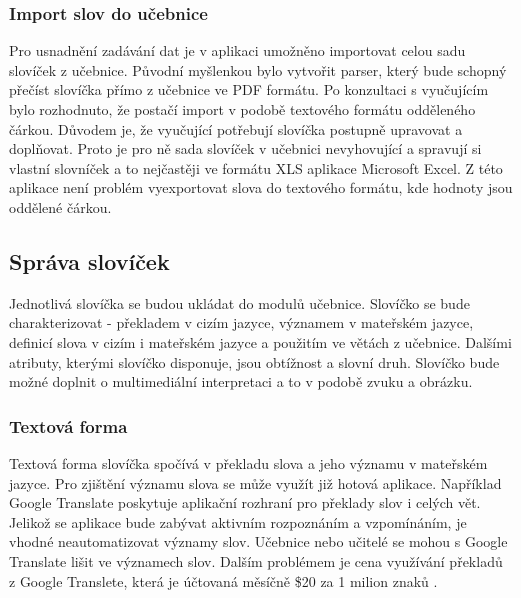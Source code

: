 \documentclass[a4paper,11pt,titlepage,fleqn]{article}
\begin{document}
        \subsubsection{Import slov do učebnice}
            Pro usnadnění zadávání dat je v aplikaci umožněno importovat celou sadu slovíček z učebnice. Původní myšlenkou bylo vytvořit parser, který bude schopný přečíst slovíčka přímo z učebnice ve PDF formátu. Po konzultaci s vyučujícím bylo rozhodnuto, že postačí import v podobě textového formátu odděleného čárkou. Důvodem je, že vyučující potřebují slovíčka postupně upravovat a doplňovat. Proto je pro ně sada slovíček v učebnici nevyhovující a spravují si vlastní slovníček a to nejčastěji ve formátu XLS aplikace Microsoft Excel. Z této aplikace není problém vyexportovat slova do textového formátu, kde hodnoty jsou oddělené čárkou.

    \subsection{Správa slovíček}

        Jednotlivá slovíčka se budou ukládat do modulů učebnice. Slovíčko se bude charakterizovat - překladem v cizím jazyce, významem v mateřském jazyce, definicí slova v cizím i mateřském jazyce a použitím ve větách z učebnice. Dalšími atributy, kterými slovíčko disponuje, jsou obtížnost a slovní druh. Slovíčko bude možné doplnit o multimediální interpretaci a to v podobě zvuku a obrázku.

        \subsubsection{Textová forma}
            Textová forma slovíčka spočívá v překladu slova a jeho významu v mateřském jazyce. Pro zjištění významu slova se může využít již hotová aplikace. Například Google Translate poskytuje aplikační rozhraní pro překlady slov i celých vět. Jelikož se aplikace bude zabývat aktivním rozpoznáním a vzpomínáním, je vhodné neautomatizovat významy slov. Učebnice nebo učitelé se mohou s Google Translate lišit ve významech slov. Dalším problémem je cena využívání překladů z Google Translete, která je účtovaná měsíčně \$20 za 1 milion znaků \cite{bib:google-api}.
\end{document}
